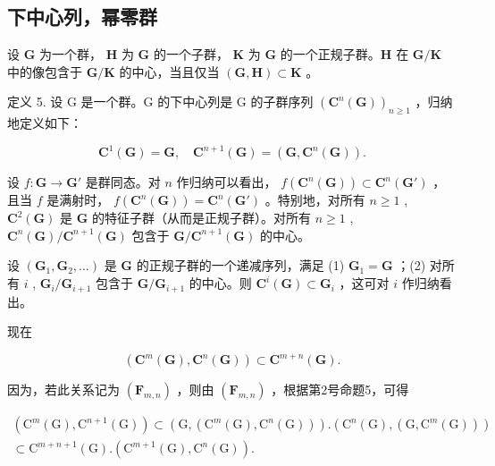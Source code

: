 \subsection{下中心列，幂零群}

设 \(\mathbf{G}\) 为一个群， \(\mathbf{H}\) 为 \(\mathbf{G}\) 的一个子群， \(\mathbf{K}\) 为 \(\mathbf{G}\) 的一个正规子群。\(\mathbf{H}\) 在 \(\mathbf{G} / \mathbf{K}\) 中的像包含于 \(\mathbf{G} / \mathbf{K}\) 的中心，当且仅当 \((\mathbf{G}, \mathbf{H}) \subset \mathbf{K}\) 。

定义 5. 设 G 是一个群。G 的下中心列是 G 的子群序列 \((\mathbf{C}^n (\mathbf{G}))_{n\geqslant 1}\) ，归纳地定义如下：

\[
\mathbf {C} ^ {1} (\mathbf {G}) = \mathbf {G}, \quad \mathbf {C} ^ {n + 1} (\mathbf {G}) = (\mathbf {G}, \mathbf {C} ^ {n} (\mathbf {G})).
\]

设 \(f: \mathbf{G} \to \mathbf{G}'\) 是群同态。对 \(n\) 作归纳可以看出， \(f(\mathbf{C}^n(\mathbf{G})) \subset \mathbf{C}^n(\mathbf{G}')\) ，且当 \(f\) 是满射时， \(f(\mathbf{C}^n(\mathbf{G})) = \mathbf{C}^n(\mathbf{G}')\) 。特别地，对所有 \(n \geqslant 1\) , \(\mathbf{C}^2(\mathbf{G})\) 是 \(\mathbf{G}\) 的特征子群（从而是正规子群）。对所有 \(n \geqslant 1\) , \(\mathbf{C}^n(\mathbf{G}) / \mathbf{C}^{n+1}(\mathbf{G})\) 包含于 \(\mathbf{G} / \mathbf{C}^{n+1}(\mathbf{G})\) 的中心。

设 \((\mathbf{G}_1, \mathbf{G}_2, \ldots)\) 是 \(\mathbf{G}\) 的正规子群的一个递减序列，满足 (1) \(\mathbf{G}_1 = \mathbf{G}\) ；(2) 对所有 \(i\) , \(\mathbf{G}_i / \mathbf{G}_{i+1}\) 包含于 \(\mathbf{G} / \mathbf{G}_{i+1}\) 的中心。则 \(\mathbf{C}^i(\mathbf{G}) \subset \mathbf{G}_i\) ，这可对 \(i\) 作归纳看出。

现在

\[
\left(\mathbf {C} ^ {m} (\mathbf {G}), \mathbf {C} ^ {n} (\mathbf {G})\right) \subset \mathbf {C} ^ {m + n} (\mathbf {G}).\tag{7}
\]

因为，若此关系记为 \((\mathbf{F}_{m,n})\) ，则由 \((\mathbf{F}_{m,n})\) ，根据第2号命题5，可得

\[
\begin{array}{l} \left(\mathrm{C} ^ {m} (\mathrm{G}), \mathrm{C} ^ {n + 1} (\mathrm{G})\right) \subset \left(\mathrm{G}, \left(\mathrm{C} ^ {m} (\mathrm{G}), \mathrm{C} ^ {n} (\mathrm{G})\right)\right). \left(\mathrm{C} ^ {n} (\mathrm{G}), \left(\mathrm{G}, \mathrm{C} ^ {m} (\mathrm{G})\right)\right) \\ \subset \mathrm{C} ^ {m + n + 1} (\mathrm{G}). \left(\mathrm{C} ^ {m + 1} (\mathrm{G}), \mathrm{C} ^ {n} (\mathrm{G})\right). \end{array}
\]

